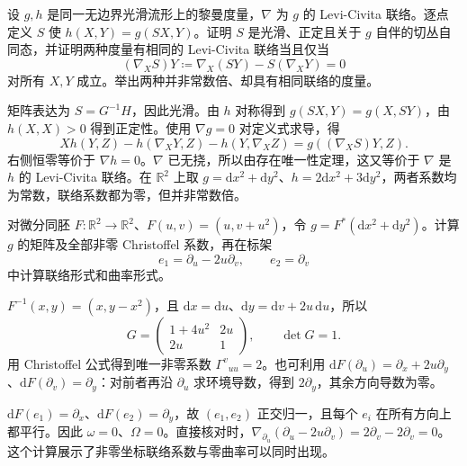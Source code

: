 \begin{exercise}\label{g3:ex:same-connection-two-metrics}
	设 \(g,h\) 是同一无边界光滑流形上的黎曼度量，\(\nabla\) 为 \(g\) 的 Levi-Civita 联络。逐点定义 \(S\) 使 \(h(X,Y)=g(SX,Y)\)。证明 \(S\) 是光滑、正定且关于 \(g\) 自伴的切丛自同态，并证明两种度量有相同的 Levi-Civita 联络当且仅当
	\[
		(\nabla_XS)Y\coloneqq\nabla_X(SY)-S(\nabla_XY)=0
	\]
	对所有 \(X,Y\) 成立。举出两种并非常数倍、却具有相同联络的度量。
\end{exercise}
\begin{solution}
	矩阵表达为 \(S=G^{-1}H\)，因此光滑。由 \(h\) 对称得到 \(g(SX,Y)=g(X,SY)\)，由 \(h(X,X)>0\) 得到正定性。使用 \(\nabla g=0\) 对定义式求导，得
	\[
		Xh(Y,Z)-h(\nabla_XY,Z)-h(Y,\nabla_XZ)
		=g((\nabla_XS)Y,Z).
	\]
	右侧恒零等价于 \(\nabla h=0\)。\(\nabla\) 已无挠，所以由存在唯一性定理，这又等价于 \(\nabla\) 是 \(h\) 的 Levi-Civita 联络。在 \(\mathbb R^2\) 上取 \(g=\mathrm dx^2+\mathrm dy^2\)、\(h=2\mathrm dx^2+3\mathrm dy^2\)，两者系数均为常数，联络系数都为零，但并非常数倍。
\end{solution}

\begin{exercise}\label{g3:ex:shear-coordinates}
	对微分同胚 \(F:\mathbb R^2\to\mathbb R^2\)、\(F(u,v)=(u,v+u^2)\)，令 \(g=F^*(\mathrm dx^2+\mathrm dy^2)\)。计算 \(g\) 的矩阵及全部非零 Christoffel 系数，再在标架
	\[
		e_1=\partial_u-2u\partial_v,\qquad e_2=\partial_v
	\]
	中计算联络形式和曲率形式。
\end{exercise}
\begin{solution}
	\(F^{-1}(x,y)=(x,y-x^2)\)，且 \(\mathrm dx=\mathrm du\)、\(\mathrm dy=\mathrm dv+2u\,\mathrm du\)，所以
	\[
		G=\begin{pmatrix}1+4u^2&2u\\2u&1\end{pmatrix},\qquad \det G=1.
	\]
	用 Christoffel 公式得到唯一非零系数 \(\Gamma^v{}_{uu}=2\)。也可利用 \(\mathrm dF(\partial_u)=\partial_x+2u\partial_y\)、\(\mathrm dF(\partial_v)=\partial_y\)：对前者再沿 \(\partial_u\) 求环境导数，得到 \(2\partial_y\)，其余方向导数为零。

	\(\mathrm dF(e_1)=\partial_x\)、\(\mathrm dF(e_2)=\partial_y\)，故 \((e_1,e_2)\) 正交归一，且每个 \(e_i\) 在所有方向上都平行。因此 \(\omega=0\)、\(\Omega=0\)。直接核对时，\(\nabla_{\partial_u}(\partial_u-2u\partial_v)=2\partial_v-2\partial_v=0\)。这个计算展示了非零坐标联络系数与零曲率可以同时出现。
\end{solution}


